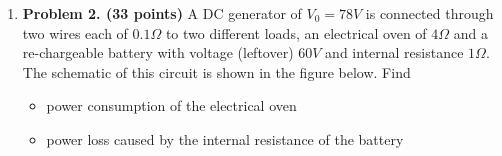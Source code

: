 \begin{enumerate}
\item {\bf Problem 2. (33 points)} 
A DC generator of $V_0=78V$ is connected through two wires each of 
$0.1\Omega$ to two different loads, an electrical oven of $4\Omega$ 
and a re-chargeable battery with voltage (leftover) $60V$ and internal 
resistance $1\Omega$. The schematic of this circuit is shown in the 
figure below. Find
\begin{itemize}
	\item power consumption of the electrical oven
	\item power loss caused by the internal resistance of the battery
\end{itemize}










\end{enumerate}
